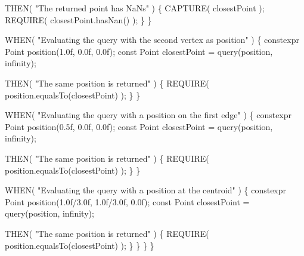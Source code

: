 \begin{DoxyCodeInclude}
            THEN( \textcolor{stringliteral}{"The returned point has NaNs"} )
            \{
                CAPTURE( closestPoint );
                REQUIRE( closestPoint.hasNan() );
            \}
        \}

        WHEN( \textcolor{stringliteral}{"Evaluating the query with the second vertex as position"} )
        \{
            constexpr Point position(1.0f, 0.0f, 0.0f);
            \textcolor{keyword}{const} Point closestPoint = query(position, infinity);

            THEN( \textcolor{stringliteral}{"The same position is returned"} )
            \{
                REQUIRE( position.equalsTo(closestPoint) );
            \}
        \}

        WHEN( \textcolor{stringliteral}{"Evaluating the query with a position on the first edge"} )
        \{
            constexpr Point position(0.5f, 0.0f, 0.0f);
            \textcolor{keyword}{const} Point closestPoint = query(position, infinity);

            THEN( \textcolor{stringliteral}{"The same position is returned"} )
            \{
                REQUIRE( position.equalsTo(closestPoint) );
            \}
        \}

        WHEN( \textcolor{stringliteral}{"Evaluating the query with a position at the centroid"} )
        \{
            constexpr Point position(1.0f/3.0f, 1.0f/3.0f, 0.0f);
            \textcolor{keyword}{const} Point closestPoint = query(position, infinity);

            THEN( \textcolor{stringliteral}{"The same position is returned"} )
            \{
                REQUIRE( position.equalsTo(closestPoint) );
            \}
        \}
    \}
\}
\end{DoxyCodeInclude}
